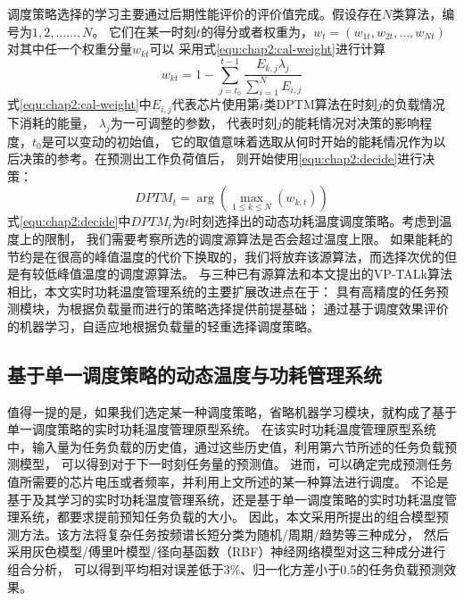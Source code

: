 调度策略选择的学习主要通过后期性能评价的评价值完成。假设存在$N$类算法，编号为$1,2,……,N$。 它们在某一时刻$t$的得分或者权重为，$w_t=(w_{1t},w_{2t},...,w_{Nt})$对其中任一个权重分量$w_{kt}$可以 采用式\ref{equ:chap2:cal-weight}进行计算
\begin{equation}
\label{equ:chap2:cal-weight}
w_{kt} = 1- \sum\limits_{j=t_0}^{t-1} \frac{E_{k,j}\lambda_j}{\sum\limits_{i=1}^N E_{i,j}}
\end{equation}
式\ref{equ:chap2:cal-weight}中$E_{i,j}$代表芯片使用第$i$类DPTM算法在时刻$j$的负载情况下消耗的能量， $\lambda_{j}$为一可调整的参数， 代表时刻$j$的能耗情况对决策的影响程度，$t_0$是可以变动的初始值， 它的取值意味着选取从何时开始的能耗情况作为以后决策的参考。在预测出工作负荷值后， 则开始使用\ref{equ:chap2:decide}进行决策：
\begin{equation}
\label{equ:chap2:decide}
DPTM_t = \arg(\max\limits_{1\le k \le N}(w_{k,t}))
\end{equation}
式\ref{equ:chap2:decide}中$DPTM_t$为$t$时刻选择出的动态功耗温度调度策略。考虑到温度上的限制， 我们需要考察所选的调度源算法是否会超过温度上限。 如果能耗的节约是在很高的峰值温度的代价下换取的，我们将放弃该源算法，而选择次优的但是有较低峰值温度的调度源算法。
与三种已有源算法和本文提出的VP-TALk算法相比，本文实时功耗温度管理系统的主要扩展改进点在于： 具有高精度的任务预测模块，为根据负载量而进行的策略选择提供前提基础； 通过基于调度效果评价的机器学习，自适应地根据负载量的轻重选择调度策略。

\subsection{基于单一调度策略的动态温度与功耗管理系统}
值得一提的是，如果我们选定某一种调度策略，省略机器学习模块，就构成了基于单一调度策略的实时功耗温度管理原型系统。 在该实时功耗温度管理原型系统中，输入量为任务负载的历史值，通过这些历史值，利用第六节所述的任务负载预测模型， 可以得到对于下一时刻任务量的预测值。 进而，可以确定完成预测任务值所需要的芯片电压或者频率，并利用上文所述的某一种算法进行调度。
不论是基于及其学习的实时功耗温度管理系统，还是基于单一调度策略的实时功耗温度管理系统，都要求提前预知任务负载的大小。 因此，本文采用所提出的组合模型预测方法。该方法将复杂任务按频谱长短分类为随机/周期/趋势等三种成分， 然后采用灰色模型/傅里叶模型/径向基函数（RBF）神经网络模型对这三种成分进行组合分析， 可以得到平均相对误差低于3\%、归一化方差小于0.5的任务负载预测效果。 